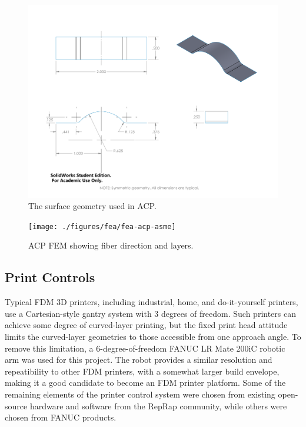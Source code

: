 \begin{figure}[htp]
\centering
\includegraphics[width=0.8\linewidth]{./figures/fea/fea-surface-geometry}
\caption{The surface geometry used in ACP.}
\label{fig:fea-bridge-speciment}
\end{figure}

\begin{figure}[htp]
\centering
\texttt{[image: ./figures/fea/fea-acp-asme]}
\caption{ACP FEM showing fiber direction and layers.}
\label{fig:fea-acp-asme}
\end{figure}


\subsection*{Print Controls}

Typical FDM 3D printers, including industrial, home, and do-it-yourself printers, use a Cartesian-style gantry system with 3 degrees of freedom. Such printers can achieve some degree of curved-layer printing, but the fixed print head attitude limits the curved-layer geometries to those accessible from one approach angle. To remove this limitation, a 6-degree-of-freedom FANUC LR Mate 200iC robotic arm was used for this project. The robot provides a similar resolution and repeatibility to other FDM printers, with a somewhat larger build envelope, making it a good candidate to become an FDM printer platform. Some of the remaining elements of the printer control system were chosen from existing open-source hardware and software from the RepRap community, while others were chosen from FANUC products.

